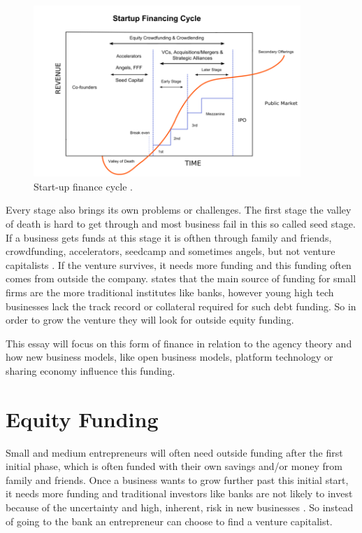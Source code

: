 \documentclass[a4paper, 11pt]{article}
\begin{document}
\begin{figure}[h!]
    \centering
    \includegraphics[width=0.9\textwidth]{FinCycle.png}
    \caption{Start-up finance cycle \cite{wiki}.}
    \label{fig:graph1}
\end{figure}

Every stage also brings its own problems or challenges. The first stage the valley of death is hard to get through and most business fail in this so called seed stage. If a business gets funds at this stage it is ofthen through family and friends, crowdfunding, accelerators, seedcamp and sometimes angels, but not venture capitalists \citep{TiddBessant}. If the venture survives, it needs more funding and this funding often comes from outside the company. \cite{casson2008oxford} states that the main source of funding for small firms are the more traditional institutes like banks, however young high tech businesses lack the track record or collateral required for such debt funding. So in order to grow the venture they will look for outside equity funding.

This essay will focus on this form of finance in relation to the agency theory and how new business models, like open business models, platform technology or sharing economy influence this funding.

\section{Equity Funding}

Small and medium entrepreneurs will often need outside funding after the first initial phase, which is often funded with their own savings and/or money from family and friends. Once a business wants to grow further past this initial start, it needs more funding and traditional investors like banks are not likely to invest because of the uncertainty and high, inherent, risk in new businesses \citep{Osnabrugge2000}. So instead of going to the bank an entrepreneur can choose to find a venture capitalist.
\end{document}
